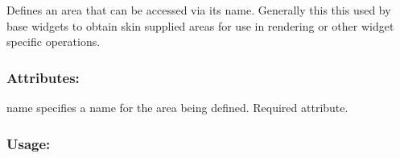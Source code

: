 Defines an area that can be accessed via it\textquotesingle{}s name. Generally this this used by base widgets to obtain skin supplied areas for use in rendering or other widget specific operations.\hypertarget{fal_element_ref_fal_elem_ref_sec_24_2}{}\subsubsection{Attributes\+:}\label{fal_element_ref_fal_elem_ref_sec_24_2}
\begin{DoxyItemize}
\item {\ttfamily name} specifies a name for the area being defined. Required attribute.\end{DoxyItemize}
\hypertarget{fal_element_ref_fal_elem_ref_sec_24_3}{}\subsubsection{Usage\+:}\label{fal_element_ref_fal_elem_ref_sec_24_3}

